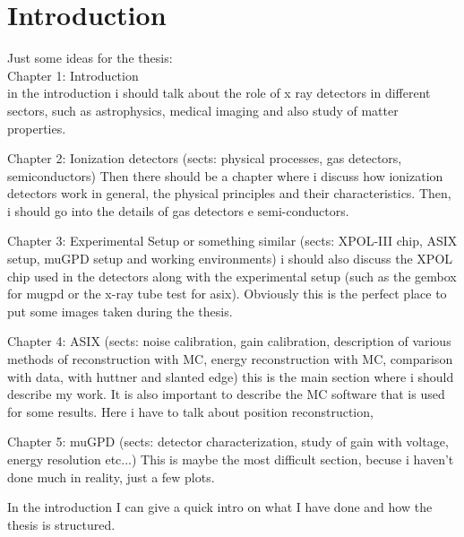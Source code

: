 \chapter{Introduction}
\label{chap:introduction}

Just some ideas for the thesis:\\

Chapter 1: Introduction\\
in the introduction i should talk about the role of x ray detectors in different sectors, such as astrophysics, medical imaging and also study of matter properties.

Chapter 2: Ionization detectors (sects: physical processes, gas detectors, semiconductors)
Then there should be a chapter where i discuss how ionization detectors work in general, the physical principles and their characteristics. Then, i should go into the details of gas detectors e semi-conductors.

Chapter 3: Experimental Setup or something similar (sects: XPOL-III chip, ASIX setup, muGPD setup and working environments)
i should also discuss the XPOL chip used in the detectors along with the experimental setup (such as the gembox for mugpd or the x-ray tube test for asix). Obviously this is the perfect place to put some images taken during the thesis.

Chapter 4: ASIX (sects: noise calibration, gain calibration, description of various methods of reconstruction with MC, energy reconstruction with MC, comparison with data, with huttner and slanted edge)
this is the main section where i should describe my work. It is also important to describe the MC software that is used for some results. Here i have to talk about position reconstruction, 

Chapter 5: muGPD (sects: detector characterization, study of gain with voltage, energy resolution etc...)
This is maybe the most difficult section, becuse i haven't done much in reality, just a few plots.

In the introduction I can give a quick intro on what I have done and how the thesis is structured.